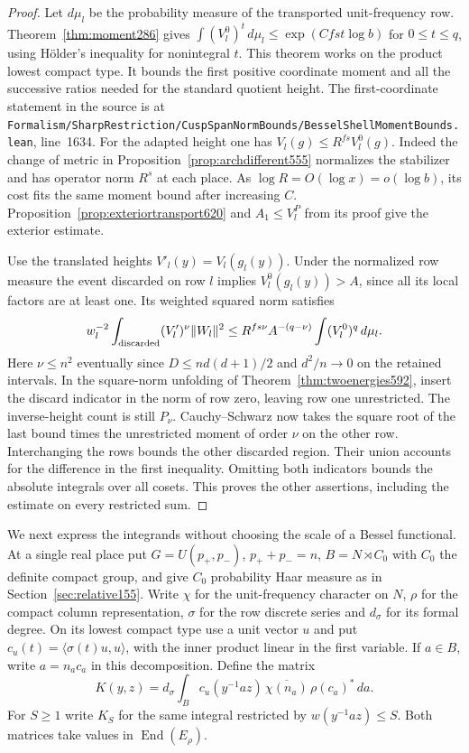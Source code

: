 \documentclass[a4paper,11pt]{article}
\theoremstyle{definition}
\theoremstyle{remark}
\newcommand{\srcloc}[2]{{\small\nolinkurl{#1.lean}}, line~#2}
\numberwithin{equation}{section}
\begin{document}
\begin{proof}
Let \(d\mu_l\) be the probability measure of the transported
unit-frequency row. Theorem~\ref{thm:moment286} gives
\(\int(V_l^0)^t\,d\mu_l\le\exp(Cfst\log b)\) for
\(0\le t\le q\), using H\"older's inequality for nonintegral
\(t\). This theorem works on the product lowest compact type.
It bounds the first positive coordinate moment and all the
successive ratios needed for the standard quotient height.
The first-coordinate statement in the source is at
\srcloc{Formalism/SharpRestriction/CuspSpanNormBounds/BesselShellMomentBounds}{1634}.
For the adapted height one has
\(V_l(g)\le R^{fs}V_l^0(g)\). Indeed the change of metric in
Proposition~\ref{prop:archdifferent555} normalizes the
stabilizer and has operator norm \(R^s\) at each place.
As \(\log R=O(\log x)=o(\log b)\), its cost fits the same
moment bound after increasing \(C\). Proposition~\ref{prop:exteriortransport620}
and \(A_1\le V_l^P\) from its proof give the exterior estimate.

Use the translated heights \(V'_l(y)=V_l(g_l(y))\). Under the
normalized row measure the event discarded on row \(l\) implies
\(V_l^0(g_l(y))> A\), since all its local factors are at least
one. Its weighted squared norm satisfies
\[
 w_l^{-2}\int_{\rm discarded}(V'_l)^\nu\|W_l\|^2
       \le R^{fs\nu}A^{-(q-\nu)}
                          \int(V_l^0)^q\,d\mu_l .
\]
Here \(\nu\le n^2\) eventually since \(D\le nd(d+1)/2\) and
\(d^2/n\to0\) on the retained intervals. In the square-norm
unfolding of Theorem~\ref{thm:twoenergies592}, insert the
discard indicator in the norm of row zero, leaving row one
unrestricted. The inverse-height count is still \(P_\nu\).
Cauchy--Schwarz now takes the square root of the last bound
times the unrestricted moment of order \(\nu\) on the other
row. Interchanging the rows bounds the other discarded region.
Their union accounts for the difference in the first inequality.
Omitting both indicators bounds the absolute integrals over all
cosets. This proves the other assertions, including the estimate
on every restricted sum.
\end{proof}

We next express the integrands without choosing the scale of a
Bessel functional. At a single real place put \(G=U(p_+,p_-)\),
\(p_++p_-=n\), \(B=N\rtimes C_0\) with \(C_0\) the definite
compact group, and give \(C_0\) probability Haar measure as in
Section~\ref{sec:relative155}. Write \(\chi\) for the unit-frequency
character on \(N\), \(\rho\) for the compact column representation,
\(\sigma\) for the row discrete series and \(d_\sigma\) for its
formal degree. On its lowest compact type use a unit vector \(u\)
and put \(c_u(t)=\langle\sigma(t)u,u\rangle\), with the inner
product linear in the first variable. If \(a\in B\), write
\(a=n_a c_a\) in this decomposition. Define the matrix
\[
 K(y,z)=d_\sigma\int_B c_u(y^{-1}a z)\,
                \overline{\chi(n_a)}\,\rho(c_a)^*\,da .
\]
For \(S\ge1\) write \(K_S\) for the same integral restricted
by \(w(y^{-1}a z)\le S\). Both matrices take values in
\(\operatorname{End}(E_\rho)\).
\end{document}
